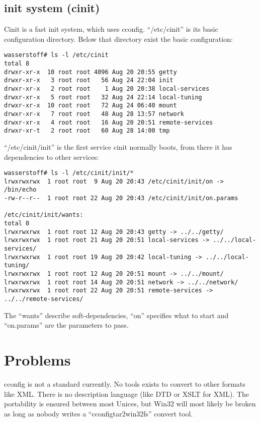 \documentclass[11pt,a4paper]{article}
\begin{document}
\subsection{init system (cinit)}
Cinit\cite{cinit} is a fast init system, which uses cconfig.
"`/etc/cinit"' is its basic configuration directory. Below that directory
exist the basic configuration:
\begin{verbatim}
wasserstoff# ls -l /etc/cinit         
total 8
drwxr-xr-x  10 root root 4096 Aug 20 20:55 getty
drwxr-xr-x   3 root root   56 Aug 24 22:04 init
drwxr-xr-x   2 root root    1 Aug 20 20:38 local-services
drwxr-xr-x   5 root root   32 Aug 24 22:14 local-tuning
drwxr-xr-x  10 root root   72 Aug 24 06:40 mount
drwxr-xr-x   7 root root   48 Aug 28 13:57 network
drwxr-xr-x   4 root root   16 Aug 20 20:51 remote-services
drwxr-xr-t   2 root root   60 Aug 28 14:00 tmp
\end{verbatim}
"`/etc/cinit/init"' is the first service cinit normally boots,
from there it has dependencies to other services:
\begin{verbatim}
wasserstoff# ls -l /etc/cinit/init/*
lrwxrwxrwx  1 root root  9 Aug 20 20:43 /etc/cinit/init/on -> /bin/echo
-rw-r--r--  1 root root 22 Aug 20 20:43 /etc/cinit/init/on.params

/etc/cinit/init/wants:
total 0
lrwxrwxrwx  1 root root 12 Aug 20 20:43 getty -> ../../getty/
lrwxrwxrwx  1 root root 21 Aug 20 20:51 local-services -> ../../local-services/
lrwxrwxrwx  1 root root 19 Aug 20 20:42 local-tuning -> ../../local-tuning/
lrwxrwxrwx  1 root root 12 Aug 20 20:51 mount -> ../../mount/
lrwxrwxrwx  1 root root 14 Aug 20 20:51 network -> ../../network/
lrwxrwxrwx  1 root root 22 Aug 20 20:51 remote-services -> ../../remote-services/
\end{verbatim}
The "`wants"' describe soft-dependencies, "`on"' specifies what to start
and "`on.params"' are the parameters to pass.
\section{Problems}
cconfig is not a standard currently.
No tools exists to convert to other formats like XML.
There is no description language (like DTD or XSLT for XML).
The portability is ensured between most Unices, but Win32 will
most likely be broken as long as nobody writes a "`cconfigtar2win32fs"'
convert tool.
\end{document}
